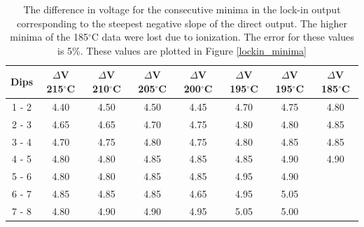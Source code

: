 \documentclass[prb,preprint]{revtex4-1}
\begin{document}
\begin{table}[h!]
\centering

\caption{The difference in voltage for the consecutive minima in the lock-in output corresponding to the steepest negative slope of the direct output. The higher minima of the 185$^{\circ}$C data were lost due to ionization. The error for these values is 5$\%$. These values are plotted in Figure \ref{lockin_minima}}

\begin{ruledtabular}
\begin{tabular}{c c c c c c c c}
Dips & $\Delta$V 215$^{\circ}$C & $\Delta$V 210$^{\circ}$C  & $\Delta$V 205$^{\circ}$C &$\Delta$V 200$^{\circ}$C  & $\Delta$V 195$^{\circ}$C  & $\Delta$V 195$^{\circ}$C &$\Delta$V 185$^{\circ}$C  \\
\hline	%
1 - 2 & 4.40  & 4.50 & 4.50 & 4.45 & 4.70 & 4.75 & 4.80 \\
2 - 3 & 4.65  & 4.65 & 4.70 & 4.75 & 4.80 & 4.80 & 4.85 \\
3 - 4 & 4.70  & 4.75 & 4.80 & 4.75 & 4.80 & 4.85 & 4.85 \\
4 - 5 & 4.80  & 4.80 & 4.85 & 4.85 & 4.85 & 4.90 & 4.90 \\
5 - 6 & 4.80  & 4.80 & 4.85 & 4.85 & 4.95 & 4.90 &         \\
6 - 7 & 4.85  & 4.85 & 4.85 & 4.65 & 4.95 & 5.05 &         \\
7 - 8 & 4.80  & 4.90 & 4.90 & 4.95 & 5.05 & 5.00 &         \\

\end{tabular}
\end{ruledtabular}
\label{hg_lockin_table_min}
\end{table}
\end{document}
